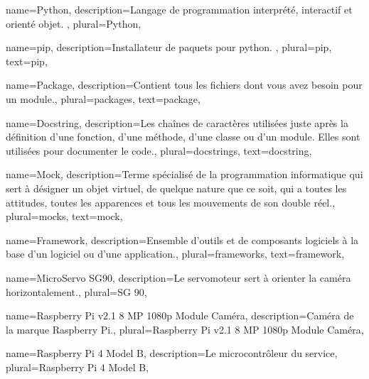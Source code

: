 {
    name={Python},
    description={Langage de programmation interprété, interactif et orienté objet. \cite{python}},
    plural={Python},
}

{
    name={pip},
    description={Installateur de \glspl{paquet} pour \gls{python}. \cite{pip}},
    plural={pip},
    text={pip},
}

{
    name={Package},
    description={Contient tous les fichiers dont vous avez besoin pour un module.},
    plural={packages},
    text={package},
}

{
    name={Docstring},
    description={Les chaînes de caractères utilisées juste après la définition d'une fonction, d'une méthode, d'une
            classe ou d'un module. Elles sont utilisées pour documenter le code.},
    plural={docstrings},
    text={docstring},
}

{
    name={Mock},
    description={Terme spécialisé de la programmation informatique qui sert à désigner un objet virtuel, de quelque
            nature que ce soit, qui a toutes les attitudes, toutes les apparences et tous les mouvements de son double
            réel.},
    plural={mocks},
    text={mock},
}

{
    name={Framework},
    description={Ensemble d'outils et de composants logiciels à la base d'un logiciel ou d'une application.},
    plural={frameworks},
    text={framework},
}
    
{
    name={MicroServo SG90},
    description={Le servomoteur sert à orienter la caméra horizontalement.},
    plural={SG 90},
}

{
    name={Raspberry Pi v2.1 8 MP 1080p Module Caméra},
    description={Caméra de la marque Raspberry Pi.},
    plural={Raspberry Pi v2.1 8 MP 1080p Module Caméra},
}

{
    name={Raspberry Pi 4 Model B},
    description={Le microcontrôleur du service},
    plural={Raspberry Pi 4 Model B},
}